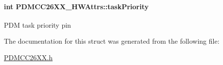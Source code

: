 \paragraph[{task\+Priority}]{\setlength{\rightskip}{0pt plus 5cm}int P\+D\+M\+C\+C26\+X\+X\+\_\+\+H\+W\+Attrs\+::task\+Priority}\label{struct_p_d_m_c_c26_x_x___h_w_attrs_a5169287c5b16c798c14fb4b5f1a77df2}
P\+D\+M task priority pin 

The documentation for this struct was generated from the following file\+:\begin{DoxyCompactItemize}
\item 
\hyperlink{_p_d_m_c_c26_x_x_8h}{P\+D\+M\+C\+C26\+X\+X.\+h}\end{DoxyCompactItemize}

